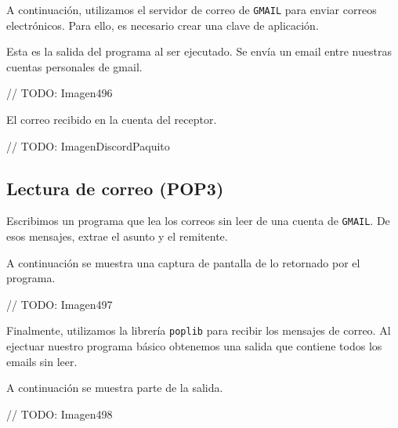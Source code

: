 A continuación, utilizamos el servidor de correo de \verb#GMAIL# para enviar correos electrónicos.
Para ello, es necesario crear una clave de aplicación.

Esta es la salida del programa al ser ejecutado.
Se envía un email entre nuestras cuentas personales de gmail.

// TODO: Imagen496

El correo recibido en la cuenta del receptor.

// TODO: ImagenDiscordPaquito

\subsection{Lectura de correo (POP3)}

Escribimos un programa que lea los correos sin leer de una cuenta de \verb#GMAIL#.
De esos mensajes, extrae el asunto y el remitente.

A continuación se muestra una captura de pantalla de lo retornado por el programa.

// TODO: Imagen497

Finalmente, utilizamos la librería \verb#poplib# para recibir los mensajes de correo.
Al ejectuar nuestro programa básico obtenemos una salida que contiene todos los emails
sin leer.

A continuación se muestra parte de la salida.

// TODO: Imagen498
